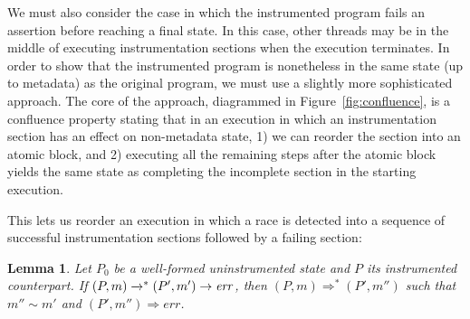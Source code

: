 \documentclass[preprint, 10pt]{sigplanconf}
\newcommand{\ignore}[1]{}
\newcommand{\cfg}[2]{\ensuremath{(#1, #2)}}
\newcommand{\execstar}[4]{\ensuremath{\cfg{#1}{#2} \tto{#3} #4}}
\newcommand{\iexec}[4]{\ensuremath{\cfg{#1}{#2} \Rightarrow_{#3} #4}}
\newcommand{\execstart}[4]{\ensuremath{\cfg{#1}{#2} \rightarrow^{*}_{#3} #4}}
\newcommand{\execs}[3]{\ensuremath{ \xrightarrow{#2}_{#1} #3}}
\newcommand{\execstars}[2]{\ensuremath{ \tto{#1} #2}}
\newcommand{\iexecstar}[3]{\ensuremath{(#1, #2) \Rightarrow^{*} #3}}
\newcommand{\tto}[1]{\mathrel{
  \vphantom{\xrightarrow{#1}}
  \smash{\xrightarrow{#1}}
  \vphantom{\to}^{*}}
}
\newtheorem{lemma}{Lemma}
\begin{document}
We must also consider the case in which the instrumented program fails an assertion before reaching a final state. In this case, other threads may be in the middle of executing instrumentation sections when the execution terminates. In order to show that the instrumented program is nonetheless in the same state (up to metadata) as the original program, we must use a slightly more sophisticated approach. The core of the approach, diagrammed in Figure~\ref{fig:confluence}, is a confluence property stating that in an execution in which an instrumentation section has an effect on non-metadata state, 1) we can reorder the section into an atomic block, and 2) executing all the remaining steps after the atomic block yields the same state as completing the incomplete section in the starting execution.
\ignore{
\begin{lemma}\label{first-effect}Let $P_0$ be a well-formed uninstrumented state and $P$ its instrumented counterpart. Suppose that $\execstar{P}{m}{}{(P_1, m_1)} \execs{t}{}{(P_2, m_2)} \execstars{P_3}{m_3}$, where $P_1$ is an instrumented suffix of $P_0$ and the step from $P_1$ to $P_2$ has an effect on non-metadata state. Then there exist $P', m', P_3', m_3'$ such that $\iexec{P}{m}{t}{(P', m')} \execstars{}{(P_3', m_3')}$, $m_3' \sim m_3$, and $\execstart{P_3}{m_3}{t}{(P_3', m_3')}$ by only executing metadata operations.\end{lemma}
\begin{proof}By noninterference and the confluence properties of the step relation.\end{proof}

We can then follow the same course as before:
\begin{lemma}\label{next-effect}Let $P_0$ be a well-formed uninstrumented state and $P$ its instrumented counterpart. If $\execstar{P}{m}{}{(P', m')}$, then either $P'$ is an instrumented suffix of $P_0$ reached by executing only metadata operations, or there are some $P_1, P_2', m_2'$ and $t$ such that $\iexec{P}{m}{t}{(P_1, m_1)} \execstars{}{(P_2', m_2')}$, $m_2' \sim m'$, and $\execstart{P'}{m'}{t}{(P_2', m_2')}$ by only executing metadata operations.\end{lemma}
\begin{proof}Analogous to the proof of Lemma~\ref{next-iexec}.\end{proof}
}
This lets us reorder an execution in which a race is detected into a sequence of successful instrumentation sections followed by a failing section:
\begin{lemma}\label{exec-fail-iexec}Let $P_0$ be a well-formed uninstrumented state and $P$ its instrumented counterpart. If $\execstar{P}{m}{}{(P', m')} \rightarrow \mathit{err}$, then $\iexecstar{P}{m}{(P', m'')}$ such that $m'' \sim m'$ and $(P', m'') \Rightarrow \mathit{err}$.\end{lemma}
\end{document}
